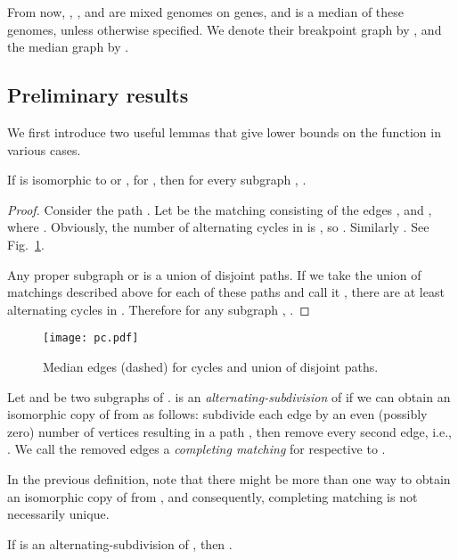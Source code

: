 \documentclass[10pt]{llncs}
\begin{document}
From now, , , and  are mixed genomes on  genes, and
 is a median of these genomes, unless otherwise specified. We
denote their breakpoint graph by , and the median graph by .

\subsection{Preliminary results}

We first introduce two useful lemmas that give lower bounds on the
function  in various cases.

\begin{lemma}\label{subpc}
  If  is isomorphic to  or , for , then for
  every subgraph , .
\end{lemma}

\begin{proof}
  Consider the path . Let  be the matching
  consisting of the edges , and ,
  where . Obviously, the number of
  alternating cycles in  is , so
  .
  Similarly .  See
  Fig.~\ref{pc}.

  Any proper subgraph  or  is a union of
  disjoint paths. If we take the union of matchings described above
  for each of these paths and call it , there are at least
   alternating cycles in . Therefore for any
  subgraph , . \end{proof}

\begin{figure}[h]{
    \begin{center}
      \texttt{[image: pc.pdf]}
      \caption{Median edges (dashed) for cycles and union of disjoint paths.}
      \label{pc}
    \end{center}
}\end{figure}

\begin{definition}
  Let  and  be two subgraphs of .  is an {\em
    alternating-subdivision} of  if we can obtain an isomorphic
  copy of  from  as follows: subdivide each edge 
  by an even (possibly zero) number of vertices resulting in a path
  , then remove every second edge, i.e.,
  . We call the removed edges
  a {\em completing matching} for  respective to .
\end{definition}

In the previous definition, note that there might be more than one way
to obtain an isomorphic copy of  from , and consequently,
completing matching is not necessarily unique.




\begin{lemma}\label{alsub}
  If  is an alternating-subdivision of , then .
\end{lemma}
\end{document}
